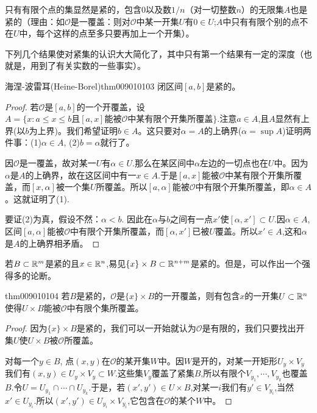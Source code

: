 只有有限个点的集显然是紧的，包含$0$以及数$1/n$（对一切整数$n$）的无限集$A$也是紧的（理由：如$\mathscr{O}$是一覆盖：则对$\mathscr{O}$中某一开集$U$有$0 \in U$;$A$中只有有限个别的点不在$U$中，每个这样的点至多只要再加上一个开集）。

下列几个结果使对紧集的认识大大简化了，其中只有第一个结果有一定的深度（也就是，用到了有关实数的一些事实）。

\begin{theorem}{海涅-波雷耳(Heine-Borel)}{thm009010103}
闭区间$[a,b]$是紧的。
\end{theorem}

\begin{proof}
若$\mathscr{O}$是$[a,b]$的一个开覆盖，设$A = \{x: a \le x \le b\text{且}[a, x]\text{能被}\mathscr{O}\text{中某有限个开集所覆盖}\}$.注意$a \in A$,且$A$显然有上界(以$b$为上界)。我们希望证明$b \in A$。这只要对$\alpha = A$的上确界($\alpha = \sup{A}$)证明两件事：(1)$\alpha \in A$, (2)$b = \alpha$就行了。

因$\mathscr{O}$是一覆盖，故对某一$U$有$\alpha \in U$.那么在某区间中$\alpha$左边的一切点也在$U$中。因为$\alpha$是$A$的上确界，故在这区间中有一$x \in A$.于是$[a, x]$能被$\mathscr{O}$中某有限个开集所覆盖，而$[x, \alpha]$被一个集$U$所覆盖。所以$[a, \alpha]$能被$\mathscr{O}$中有限个开集所覆盖，即$\alpha \in A$。这就证明了(1).

要证(2)为真，假设不然：$\alpha < b$. 因此在$\alpha$与$b$之间有一点$x'$使$[\alpha, x'] \subset U$.因$\alpha \in A$,区间$[a, \alpha]$能被$\mathscr{O}$中有限个开集所覆盖，而$[\alpha, x']$已被$U$覆盖。所以$x' \in A$,这和$\alpha$是$A$的上确界相矛盾。
\end{proof}

若$B \subset \mathbb{R}^m$是紧的且$x \in \mathbb{R}^n$,易见$\{x\}\times B \subset \mathbb{R}^{n+m}$是紧的。但是，可以作出一个强得多的论断。

\begin{theorem}{}{thm009010104}
若$B$是紧的，$\mathscr{O}$是$\{x\} \times B$的一开覆盖，则有包含$x$的一开集$U \subset \mathbb{R}^n$使得$U \times B$能被$\mathscr{O}$中有限个集所覆盖。
\end{theorem}

\begin{proof}
因为$\{x\} \times B$是紧的，我们可以一开始就认为$\mathscr{O}$是有限的，我们只要找出开集$U$使$U \times B$被$\mathscr{O}$所覆盖。

对每一个$y \in B$, 点$(x, y)$在$\mathscr{O}$的某开集$W$中。因$W$是开的，对某一开矩形$U_y \times V_y$我们有$(x, y) \in U_y \times V_y \subset W$.这些集$V_y$覆盖了紧集$B$,所以有限个$V_{y_1}, \cdots, V_{y_k}$也覆盖$B$.令$U = U_{y_1} \cap \cdots \cap U_{y_k}$.于是，若$(x', y') \in U \times B$,对某一$i$我们有$y' \in V_{y_i}$,当然$x' \in U_{y_i}$.所以$(x',y') \in U_{y_i} \times V_{y_i}$,它包含在$\mathscr{O}$的某个$W$中。
\end{proof}

